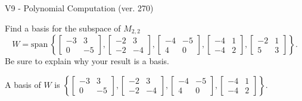 \begin{exercise}
  \begin{exerciseTitle}V9 - Polynomial Computation (ver. 270)\end{exerciseTitle}
  \begin{exerciseStatement}
    Find a basis for the subspace of \(M_{2,2}\) 
\[W=\mathrm{span}\ \left\{\left[\begin{array}{cc}
-3 & 3 \\
0 & -5
\end{array}\right] , \left[\begin{array}{cc}
-2 & 3 \\
-2 & -4
\end{array}\right] , \left[\begin{array}{cc}
-4 & -5 \\
4 & 0
\end{array}\right] , \left[\begin{array}{cc}
-4 & 1 \\
-4 & 2
\end{array}\right] , \left[\begin{array}{cc}
-2 & 1 \\
5 & 3
\end{array}\right]\right\}.\]
 Be sure to explain why your result is a basis.


  \end{exerciseStatement}
  \begin{exerciseAnswer}
   A basis of \(W\) is  \(\left\{\left[\begin{array}{cc}
-3 & 3 \\
0 & -5
\end{array}\right] , \left[\begin{array}{cc}
-2 & 3 \\
-2 & -4
\end{array}\right] , \left[\begin{array}{cc}
-4 & -5 \\
4 & 0
\end{array}\right] , \left[\begin{array}{cc}
-4 & 1 \\
-4 & 2
\end{array}\right]\right\}\).
  


  \end{exerciseAnswer}
\end{exercise}